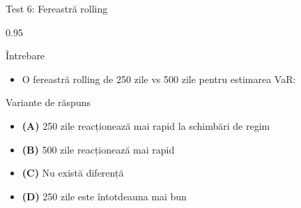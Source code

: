 \documentclass[9pt, aspectratio=169, t]{beamer}
\begin{document}
\begin{frame}{Test 6: Fereastră rolling}
    \begin{cminipage}{0.95\textwidth}
    \begin{alertblock}{Întrebare}
        \begin{itemize}\setlength{\itemsep}{0pt}
            \item O fereastră rolling de 250 zile vs 500 zile pentru estimarea VaR:
        \end{itemize}
    \end{alertblock}

    \begin{block}{Variante de răspuns}
    \begin{itemize}\setlength{\itemsep}{0pt}
        \item \textcolor{MainBlue}{\textbf{(A)}} 250 zile reacționează mai rapid la schimbări de regim
        \item \textcolor{MainBlue}{\textbf{(B)}} 500 zile reacționează mai rapid
        \item \textcolor{MainBlue}{\textbf{(C)}} Nu există diferență
        \item \textcolor{MainBlue}{\textbf{(D)}} 250 zile este întotdeauna mai bun
    \end{itemize}
    \end{block}
    \end{cminipage}
\end{frame}
\end{document}
